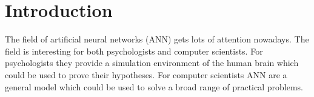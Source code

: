 
\section*{Introduction}
\label{sec:introduction} 


The field of artificial neural networks (ANN) gets lots of attention nowadays. The field is interesting for both psychologists and computer scientists. For psychologists they provide a simulation environment of the human brain which could be used to prove their hypotheses. For computer scientists ANN are a general model which could be used to solve a broad range of practical problems. 






